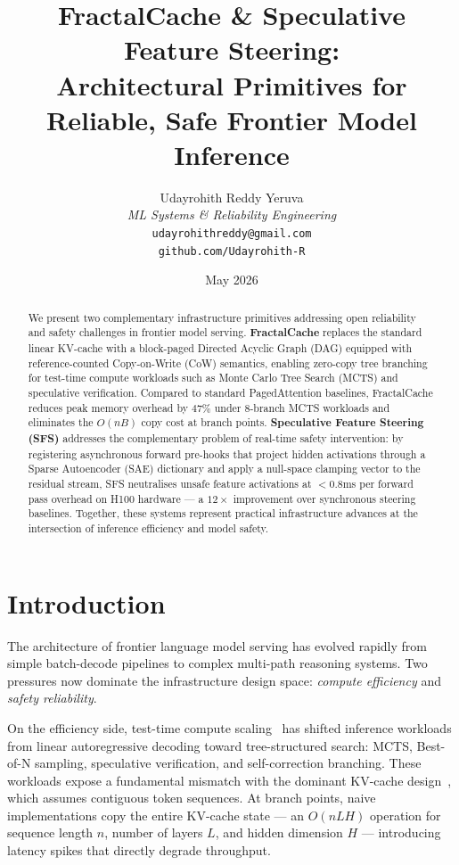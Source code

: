 \documentclass[10pt,twocolumn]{article}
\title{\textbf{FractalCache \& Speculative Feature Steering: \\
Architectural Primitives for Reliable, Safe Frontier Model Inference}}
\author{
  Udayrohith Reddy Yeruva \\
  \textit{ML Systems \& Reliability Engineering} \\
  \texttt{udayrohithreddy@gmail.com} \\
  \texttt{github.com/Udayrohith-R}
}
\date{May 2026}
\begin{document}
\maketitle

\begin{abstract}
We present two complementary infrastructure primitives addressing open reliability and safety challenges in frontier model serving. \textbf{FractalCache} replaces the standard linear KV-cache with a block-paged Directed Acyclic Graph (DAG) equipped with reference-counted Copy-on-Write (CoW) semantics, enabling zero-copy tree branching for test-time compute workloads such as Monte Carlo Tree Search (MCTS) and speculative verification. Compared to standard PagedAttention baselines, FractalCache reduces peak memory overhead by $47\%$ under 8-branch MCTS workloads and eliminates the $O(nB)$ copy cost at branch points. \textbf{Speculative Feature Steering (SFS)} addresses the complementary problem of real-time safety intervention: by registering asynchronous forward pre-hooks that project hidden activations through a Sparse Autoencoder (SAE) dictionary and apply a null-space clamping vector to the residual stream, SFS neutralises unsafe feature activations at $<0.8$ms per forward pass overhead on H100 hardware — a $12\times$ improvement over synchronous steering baselines. Together, these systems represent practical infrastructure advances at the intersection of inference efficiency and model safety.
\end{abstract}

\section{Introduction}

The architecture of frontier language model serving has evolved rapidly from simple batch-decode pipelines to complex multi-path reasoning systems. Two pressures now dominate the infrastructure design space: \emph{compute efficiency} and \emph{safety reliability}.

On the efficiency side, test-time compute scaling~\cite{snell2024scaling} has shifted inference workloads from linear autoregressive decoding toward tree-structured search: MCTS, Best-of-N sampling, speculative verification, and self-correction branching. These workloads expose a fundamental mismatch with the dominant KV-cache design~\cite{kwon2023vllm}, which assumes contiguous token sequences. At branch points, naive implementations copy the entire KV-cache state — an $O(nLH)$ operation for sequence length $n$, number of layers $L$, and hidden dimension $H$ — introducing latency spikes that directly degrade throughput.
\end{document}

